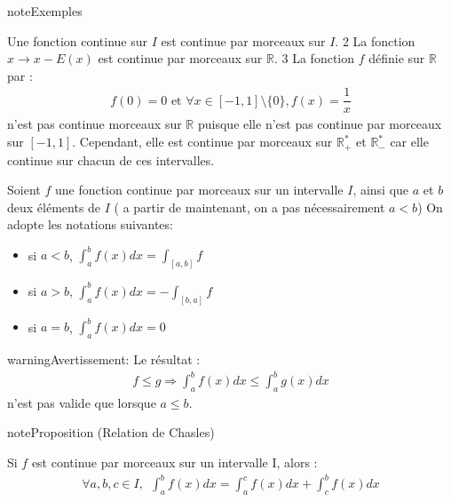 \documentclass[letterpaper,10pt,french]{sphinxmanual}
\begin{document}
\begin{sphinxadmonition}{note}{Exemples}

\sphinxhyphen{} Une fonction continue sur \(I\) est continue par morceaux sur \(I\).
2\sphinxhyphen{} La fonction \( x \to x-E(x) \) est continue par morceaux sur \(\mathbb R\).
3\sphinxhyphen{} La fonction \(f\) définie sur \(\mathbb R\) par :
\begin{equation*}
\begin{split}f(0)=0 \mbox{  et  } \forall x \in [-1, 1] \setminus \{0\}, f(x)=\dfrac{1}{x}
\end{split}
\end{equation*}
\sphinxAtStartPar
n’est pas continue morceaux sur \(\mathbb R\) puisque elle n’est pas continue par morceaux sur \([-1, 1]\). Cependant, elle est continue par morceaux sur \(\mathbb R^*_+\) et \(\mathbb R^*_-\) car elle continue sur chacun de ces intervalles.
\end{sphinxadmonition}

\sphinxAtStartPar
{}

\sphinxAtStartPar
Soient \(f\) une fonction continue par morceaux sur un intervalle \(I\), ainsi que \(a\) et \(b\) deux éléments de \(I\) ( a partir de maintenant, on a pas nécessairement \(a<b\)) On adopte les notations suivantes:
\begin{itemize}
\item {} 
\sphinxAtStartPar
si \(a<b\), \(\int_a^b f(x)dx = \int_{[a,b]} f\)

\item {} 
\sphinxAtStartPar
si \(a>b\), \(\int_a^b f(x)dx = -\int_{[b,a]} f\)

\item {} 
\sphinxAtStartPar
si \(a = b\), \(\int_a^b f(x)dx =0\)

\end{itemize}

\begin{sphinxadmonition}{warning}{Avertissement:}
\sphinxAtStartPar
Le résultat :
\begin{equation*}
\begin{split}
f \leq g \Rightarrow \int_a^b f(x)dx \leq \int_a^b g(x)dx
\end{split}
\end{equation*}
\sphinxAtStartPar
n’est pas valide que lorsque \(a\leq b\).
\end{sphinxadmonition}

\begin{sphinxadmonition}{note}{Proposition (Relation de Chasles)}

\sphinxAtStartPar
Si \(f\) est continue par morceaux sur un intervalle I, alors :
\begin{equation*}
\begin{split}
\forall a, b, c \in I, ~~ \int_a^b f(x)dx = \int_a^c f(x)dx + \int_c^b f(x)dx
\end{split}
\end{equation*}\end{sphinxadmonition}
\end{document}
